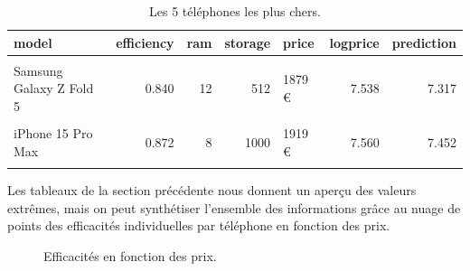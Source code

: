 \documentclass[
  12pt,
]{report}
\begin{document}
\begin{table}[!h]
\centering
\caption{\label{tab:kbl_inexpensive}Les 5 téléphones les plus chers.}
\centering
\begin{tabular}[t]{lrrrlrr}
\toprule
\textbf{model} & \textbf{efficiency} & \textbf{ram} & \textbf{storage} & \textbf{price} & \textbf{logprice} & \textbf{prediction}\\
\midrule
\cellcolor{gray!10}{Samsung Galaxy S24 Ultra} & \cellcolor{gray!10}{0.861} & \cellcolor{gray!10}{12} & \cellcolor{gray!10}{1000} & \cellcolor{gray!10}{1829 €} & \cellcolor{gray!10}{7.512} & \cellcolor{gray!10}{7.361}\\
Samsung Galaxy Z Fold 5 & 0.840 & 12 & 512 & 1879 € & 7.538 & 7.317\\
\cellcolor{gray!10}{Samsung Galaxy Z Fold 5} & \cellcolor{gray!10}{0.811} & \cellcolor{gray!10}{12} & \cellcolor{gray!10}{512} & \cellcolor{gray!10}{1879 €} & \cellcolor{gray!10}{7.538} & \cellcolor{gray!10}{7.230}\\
iPhone 15 Pro Max & 0.872 & 8 & 1000 & 1919 € & 7.560 & 7.452\\
\cellcolor{gray!10}{HONOR V2} & \cellcolor{gray!10}{0.554} & \cellcolor{gray!10}{16} & \cellcolor{gray!10}{512} & \cellcolor{gray!10}{1999 €} & \cellcolor{gray!10}{7.600} & \cellcolor{gray!10}{6.636}\\
\bottomrule
\end{tabular}
\end{table}

\newpage

Les tableaux de la section précédente nous donnent un aperçu des valeurs
extrêmes, mais on peut synthétiser l'ensemble des informations grâce au
nuage de points des efficacités individuelles par téléphone en fonction
des prix.

\begin{figure}


\caption{\label{fig-efficiency-smartspecs}Efficacités en fonction des
prix.}

\end{figure}%
\end{document}
